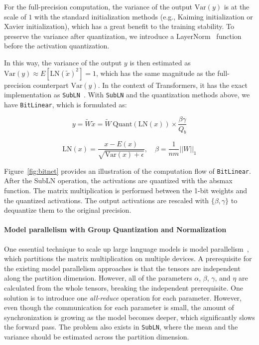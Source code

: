 For the full-precision computation, the variance of the output $\mathrm{Var}(y)$ is at the scale of $1$ with the standard initialization methods (e.g., Kaiming initialization or Xavier initialization), which has a great benefit to the training stability. To preserve the variance after quantization, we introduce a LayerNorm~\cite{layernorm} function before the activation quantization.

In this way, the variance of the output $y$ is then estimated as $\mathrm{Var}(y) \approx E[\mathrm{LN}(\widetilde{x})^2] = 1$, which has the same magnitude as the full-precision counterpart $\mathrm{Var}(y)$. In the context of Transformers, it has the exact implementation as \texttt{SubLN}~\cite{magneto}.
With \texttt{SubLN} and the quantization methods above, we have \texttt{BitLinear}, which is formulated as:

\begin{equation}
    y = \widetilde{W} \widetilde{x} = \widetilde{W}~\mathrm{Quant}(\mathrm{LN}(x)) \times \frac{\beta\gamma}{Q_b}\label{eq_quant}
\end{equation}

\begin{equation}
    \mathrm{LN}(x) = \frac{x-E(x)}{\sqrt{\mathrm{Var}(x)+\epsilon}}, \quad \beta = \frac{1}{nm}||W||_{1}
\end{equation}

Figure~\ref{fig:bitnet} provides an illustration of the computation flow of \texttt{BitLinear}. After the SubLN operation, the activations are quantized with the absmax function. The matrix multiplication is performed between the 1-bit weights and the quantized activations. The output activations are rescaled with $\{\beta, \gamma\}$ to dequantize them to the original precision.

\paragraph{Model parallelism with Group Quantization and Normalization} One essential technique to scale up large language models is model parallelism~\cite{megatron}, which partitions the matrix multiplication on multiple devices. A prerequisite for the existing model parallelism approaches is that the tensors are independent along the partition dimension. However, all of the parameters $\alpha$, $\beta$, $\gamma$, and $\eta$ are calculated from the whole tensors, breaking the independent prerequisite. One solution is to introduce one \textit{all-reduce} operation for each parameter. However, even though the communication for each parameter is small, the amount of synchronization is growing as the model becomes deeper, which significantly slows the forward pass. The problem also exists in \texttt{SubLN}, where the mean and the variance should be estimated across the partition dimension.


